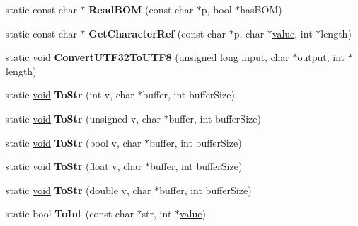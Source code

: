 \begin{DoxyCompactItemize}
static const char $\ast$ {\bfseries Read\+B\+OM} (const char $\ast$p, bool $\ast$has\+B\+OM)
\item 
\mbox{\label{classtinyxml2_1_1_x_m_l_util_a5a96e5144a8d693dc4bcd783d9964648}} 
static const char $\ast$ {\bfseries Get\+Character\+Ref} (const char $\ast$p, char $\ast$\hyperlink{unionvalue}{value}, int $\ast$length)
\item 
\mbox{\label{classtinyxml2_1_1_x_m_l_util_a31c00d5c5dfb38382de1dfcaf4be3595}} 
static \hyperlink{interfacevoid}{void} {\bfseries Convert\+U\+T\+F32\+To\+U\+T\+F8} (unsigned long input, char $\ast$output, int $\ast$length)
\item 
\mbox{\label{classtinyxml2_1_1_x_m_l_util_a3cd6c703d49b9d51bdf0f4ff6aa021c7}} 
static \hyperlink{interfacevoid}{void} {\bfseries To\+Str} (int v, char $\ast$buffer, int buffer\+Size)
\item 
\mbox{\label{classtinyxml2_1_1_x_m_l_util_ac00c2e52c1c36dab3ff41d86a9bf60f9}} 
static \hyperlink{interfacevoid}{void} {\bfseries To\+Str} (unsigned v, char $\ast$buffer, int buffer\+Size)
\item 
\mbox{\label{classtinyxml2_1_1_x_m_l_util_adba0718527ae9e80f663a71ea325cb11}} 
static \hyperlink{interfacevoid}{void} {\bfseries To\+Str} (bool v, char $\ast$buffer, int buffer\+Size)
\item 
\mbox{\label{classtinyxml2_1_1_x_m_l_util_a8957ad44fee5fa02ba52d73aad4d0a31}} 
static \hyperlink{interfacevoid}{void} {\bfseries To\+Str} (float v, char $\ast$buffer, int buffer\+Size)
\item 
\mbox{\label{classtinyxml2_1_1_x_m_l_util_a1cd141e50980fcddd6bf9af5de4b1db7}} 
static \hyperlink{interfacevoid}{void} {\bfseries To\+Str} (double v, char $\ast$buffer, int buffer\+Size)
\item 
\mbox{\label{classtinyxml2_1_1_x_m_l_util_ad4df4023d11ee3fca9689c49b9707323}} 
static bool {\bfseries To\+Int} (const char $\ast$str, int $\ast$\hyperlink{unionvalue}{value})

\end{DoxyCompactItemize}
